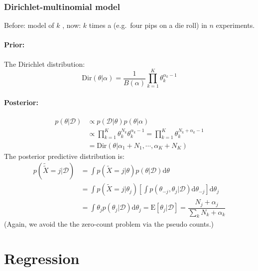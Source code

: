 \documentclass[
]{book}
\begin{document}
\hypertarget{dirichlet-multinomial-model}{%
\subsection{Dirichlet-multinomial model}\label{dirichlet-multinomial-model}}

Before: model of \(k\) , now: \(k\) times a (e.g.~four pips on a die roll)
in \(n\) experiments.

\hypertarget{prior-1}{%
\subsubsection{Prior:}\label{prior-1}}

The Dirichlet distribution:
\[\text{Dir}(\theta|\alpha) = \dfrac{1}{B({\alpha})}\prod\limits_{k=1}^K \theta_k^{\alpha_k-1}\]

\hypertarget{posterior-1}{%
\subsubsection{Posterior:}\label{posterior-1}}

\[\begin{aligned}
            p({\theta}|\mathcal{D})& \propto p(\mathcal{D}|{\theta})p({\theta|\alpha}) \\
                & \propto \prod\limits_{k=1}^K\theta_k^{N_k}\theta_k^{\alpha_k-1} = \prod\limits_{k=1}^K\theta_k^{N_k+\alpha_k-1}\\
                & =\text{Dir}({\theta}|\alpha_1+N_1,\cdots,\alpha_K+N_K)
            \end{aligned}\] The posterior predictive distribution is:
\[\begin{aligned}
                p(\tilde{\tilde{X}}=j|\mathcal{D})& =\int p(\tilde{X}=j|{\theta})p({\theta}|\mathcal{D})\mathrm{d}{\theta} \\
                    & =\int p(\tilde{X}=j|\theta_j)\left[\int p({\theta}_{-j}, \theta_j|\mathcal{D})\mathrm{d}{\theta}_{-j}\right]\mathrm{d}\theta_j \\
                    & =\int \theta_jp(\theta_j|\mathcal{D})\mathrm{d}\theta_j=\text{E}[\theta_j|\mathcal{D}]=\dfrac{N_j+\alpha_j}{\sum_k N_k+\alpha_k}
                \end{aligned}\] (Again, we avoid the the zero-count
problem via the pseudo counts.)

\hypertarget{regression}{%
\chapter{Regression}\label{regression}}
\end{document}
